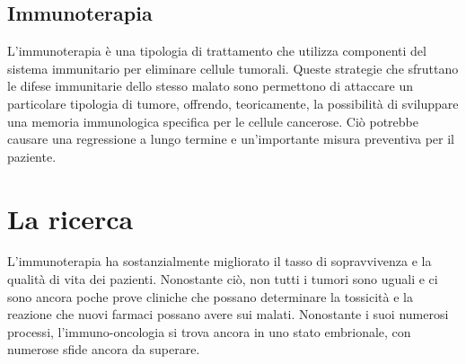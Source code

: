 \documentclass[11pt]{article}
\begin{document}
\subsection*{Immunoterapia}

L'immunoterapia è una tipologia di trattamento che utilizza componenti del sistema immunitario per eliminare cellule tumorali. Queste strategie che sfruttano le difese immunitarie dello stesso malato sono permettono di attaccare un particolare tipologia di tumore, offrendo, teoricamente, la possibilità di sviluppare una memoria immunologica specifica per le cellule cancerose.\cite{bworld} Ciò potrebbe causare una regressione a lungo termine e un'importante misura preventiva per il paziente.



\section{La ricerca}

L'immunoterapia ha sostanzialmente migliorato il tasso di sopravvivenza e la qualità di vita dei pazienti. Nonostante ciò, non tutti i tumori sono uguali e ci sono ancora poche prove cliniche che possano determinare la tossicità e la reazione che nuovi farmaci possano avere sui malati. Nonostante i suoi numerosi processi, l'immuno-oncologia si trova ancora in uno stato embrionale, con numerose sfide ancora da superare. \cite{esfahani2020review}





	
\end{document}
